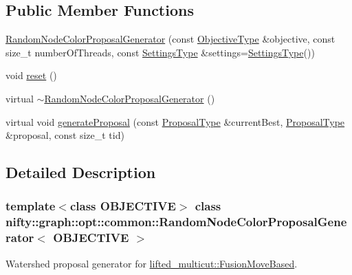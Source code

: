 \subsection*{Public Member Functions}
\begin{DoxyCompactItemize}
\item 
\hyperlink{classnifty_1_1graph_1_1opt_1_1common_1_1RandomNodeColorProposalGenerator_ada79b36836eedb827e901be1d385e805}{Random\+Node\+Color\+Proposal\+Generator} (const \hyperlink{classnifty_1_1graph_1_1opt_1_1common_1_1RandomNodeColorProposalGenerator_ac9a200d0d544cbe279eb5cfb4d51d3d5}{Objective\+Type} \&objective, const size\+\_\+t number\+Of\+Threads, const \hyperlink{structnifty_1_1graph_1_1opt_1_1common_1_1RandomNodeColorProposalGenerator_1_1SettingsType}{Settings\+Type} \&settings=\hyperlink{structnifty_1_1graph_1_1opt_1_1common_1_1RandomNodeColorProposalGenerator_1_1SettingsType}{Settings\+Type}())
\item 
void \hyperlink{classnifty_1_1graph_1_1opt_1_1common_1_1RandomNodeColorProposalGenerator_a655c003dfd00e4022478633ac21cd48c}{reset} ()
\item 
virtual \hyperlink{classnifty_1_1graph_1_1opt_1_1common_1_1RandomNodeColorProposalGenerator_aaf869008949b90cfc9c0583da99050fb}{$\sim$\+Random\+Node\+Color\+Proposal\+Generator} ()
\item 
virtual void \hyperlink{classnifty_1_1graph_1_1opt_1_1common_1_1RandomNodeColorProposalGenerator_a5862fcb54e6f7332b6466ecc8371aef4}{generate\+Proposal} (const \hyperlink{classnifty_1_1graph_1_1opt_1_1common_1_1ProposalGeneratorBase_a122993da5c326628cdb865a6279d20c5}{Proposal\+Type} \&current\+Best, \hyperlink{classnifty_1_1graph_1_1opt_1_1common_1_1ProposalGeneratorBase_a122993da5c326628cdb865a6279d20c5}{Proposal\+Type} \&proposal, const size\+\_\+t tid)
\end{DoxyCompactItemize}


\subsection{Detailed Description}
\subsubsection*{template$<$class O\+B\+J\+E\+C\+T\+I\+VE$>$\newline
class nifty\+::graph\+::opt\+::common\+::\+Random\+Node\+Color\+Proposal\+Generator$<$ O\+B\+J\+E\+C\+T\+I\+V\+E $>$}

Watershed proposal generator for \hyperlink{classnifty_1_1graph_1_1opt_1_1lifted__multicut_1_1FusionMoveBased}{lifted\+\_\+multicut\+::\+Fusion\+Move\+Based}. 


